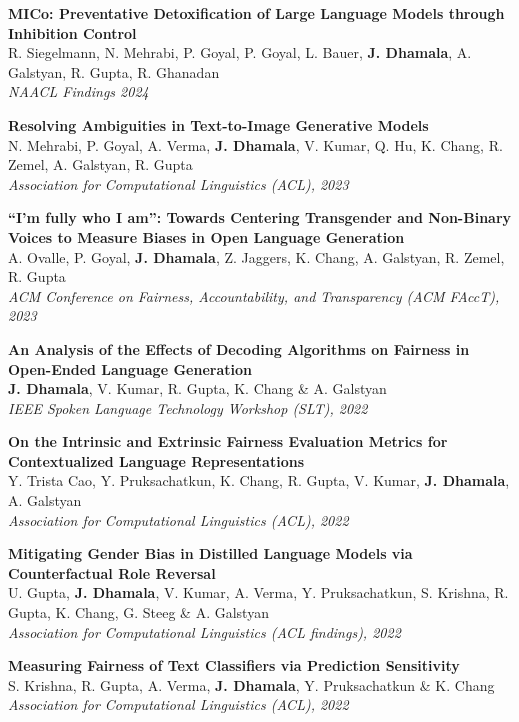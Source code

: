 \documentclass[margin]{res}
\begin{document}
\begin{resume}
\textbf{MICo: Preventative Detoxification of Large Language Models through Inhibition Control}\\
\small{R. Siegelmann, N. Mehrabi, P. Goyal, P. Goyal, L. Bauer,  \textbf{J. Dhamala}, A. Galstyan,  R. Gupta, R. Ghanadan}\\
{\sl NAACL Findings 2024}

\textbf{Resolving Ambiguities in Text-to-Image Generative Models}\\
\small{N. Mehrabi, P. Goyal, A. Verma, \textbf{J. Dhamala}, V. Kumar, Q. Hu, K. Chang, R. Zemel, A. Galstyan,  R. Gupta}\\
{\sl Association for Computational Linguistics (ACL), 2023}

\textbf{“I’m fully who I am”: Towards Centering Transgender and Non-Binary Voices to Measure Biases in Open Language Generation}\\
\small{A. Ovalle, P. Goyal, \textbf{J. Dhamala}, Z. Jaggers, K. Chang, A. Galstyan, R. Zemel,  R. Gupta}\\
{\sl ACM Conference on Fairness, Accountability, and Transparency (ACM FAccT), 2023}


\textbf{An Analysis of the Effects of Decoding Algorithms on Fairness in Open-Ended Language Generation}\\
\small{\textbf{J. Dhamala}, V. Kumar, R. Gupta, K. Chang \& A. Galstyan}\\
{\sl IEEE Spoken Language Technology Workshop (SLT), 2022}

\textbf{On the Intrinsic and Extrinsic Fairness Evaluation Metrics for Contextualized Language Representations}\\
\small{Y. Trista Cao, Y. Pruksachatkun, K. Chang, R. Gupta, V. Kumar, \textbf{J. Dhamala}, A. Galstyan}\\
{\sl Association for Computational Linguistics (ACL), 2022}

\textbf{Mitigating Gender Bias in Distilled Language Models via Counterfactual Role Reversal}\\
\small{U. Gupta, \textbf{J. Dhamala}, V. Kumar, A. Verma, Y. Pruksachatkun,  S. Krishna, R. Gupta,  K. Chang, G. Steeg \& A. Galstyan}\\
{\sl Association for Computational Linguistics (ACL findings), 2022}

\textbf{Measuring Fairness of Text Classifiers via Prediction Sensitivity}\\
\small{S. Krishna, R. Gupta, A. Verma, \textbf{J. Dhamala}, Y. Pruksachatkun  \& K. Chang}  \\
{\sl Association for Computational Linguistics (ACL), 2022}


\end{resume}
\end{document}
